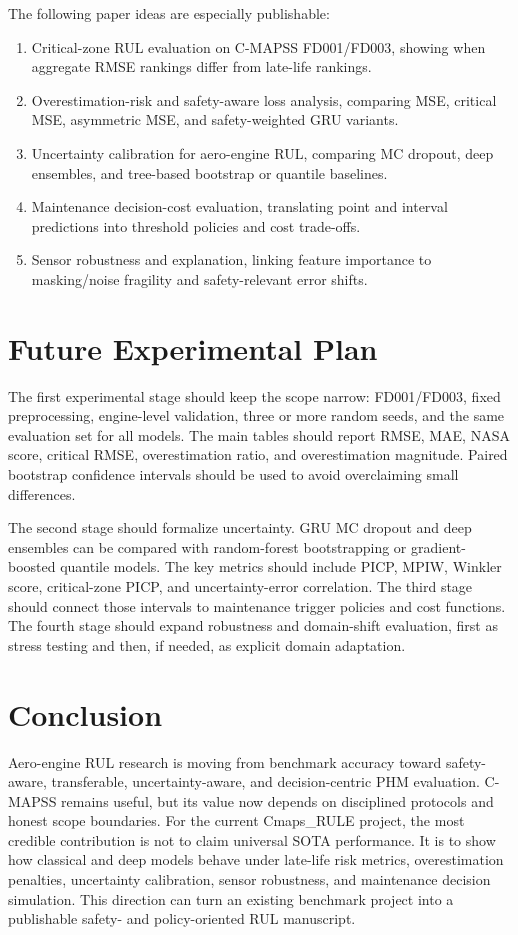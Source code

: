 \documentclass[conference]{IEEEtran}
\begin{document}
The following paper ideas are especially publishable:
\begin{enumerate}
\item Critical-zone RUL evaluation on C-MAPSS FD001/FD003, showing when aggregate RMSE rankings differ from late-life rankings.
\item Overestimation-risk and safety-aware loss analysis, comparing MSE, critical MSE, asymmetric MSE, and safety-weighted GRU variants.
\item Uncertainty calibration for aero-engine RUL, comparing MC dropout, deep ensembles, and tree-based bootstrap or quantile baselines.
\item Maintenance decision-cost evaluation, translating point and interval predictions into threshold policies and cost trade-offs.
\item Sensor robustness and explanation, linking feature importance to masking/noise fragility and safety-relevant error shifts.
\end{enumerate}

\section{Future Experimental Plan}
The first experimental stage should keep the scope narrow: FD001/FD003, fixed preprocessing, engine-level validation, three or more random seeds, and the same evaluation set for all models. The main tables should report RMSE, MAE, NASA score, critical RMSE, overestimation ratio, and overestimation magnitude. Paired bootstrap confidence intervals should be used to avoid overclaiming small differences.

The second stage should formalize uncertainty. GRU MC dropout and deep ensembles can be compared with random-forest bootstrapping or gradient-boosted quantile models. The key metrics should include PICP, MPIW, Winkler score, critical-zone PICP, and uncertainty-error correlation. The third stage should connect those intervals to maintenance trigger policies and cost functions. The fourth stage should expand robustness and domain-shift evaluation, first as stress testing and then, if needed, as explicit domain adaptation.

\section{Conclusion}
Aero-engine RUL research is moving from benchmark accuracy toward safety-aware, transferable, uncertainty-aware, and decision-centric PHM evaluation. C-MAPSS remains useful, but its value now depends on disciplined protocols and honest scope boundaries. For the current Cmaps\_RULE project, the most credible contribution is not to claim universal SOTA performance. It is to show how classical and deep models behave under late-life risk metrics, overestimation penalties, uncertainty calibration, sensor robustness, and maintenance decision simulation. This direction can turn an existing benchmark project into a publishable safety- and policy-oriented RUL manuscript.
\end{document}
